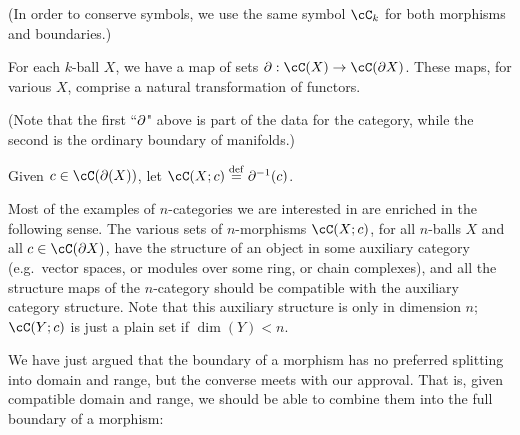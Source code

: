 (In order to conserve symbols, we use the same symbol $\cC_k$ for both morphisms and boundaries.)

\begin{axiom}
For each $k$-ball $X$, we have a map of sets $\bd: \cC(X)\to \cC(\bd X)$.
These maps, for various $X$, comprise a natural transformation of functors.
\end{axiom}

(Note that the first ``$\partial$" above is part of the data for the category, 
while the second is the ordinary boundary of manifolds.)

Given $c\in\cC(\bd(X))$, let $\cC(X; c) \deq \bd^{-1}(c)$.

Most of the examples of $n$-categories we are interested in are enriched in the following sense.
The various sets of $n$-morphisms $\cC(X; c)$, for all $n$-balls $X$ and
all $c\in \cC(\bd X)$, have the structure of an object in some auxiliary category
(e.g.\ vector spaces, or modules over some ring, or chain complexes),
and all the structure maps of the $n$-category should be compatible with the auxiliary
category structure.
Note that this auxiliary structure is only in dimension $n$;
$\cC(Y; c)$ is just a plain set if $\dim(Y) < n$.

\medskip
{}
\medskip

We have just argued that the boundary of a morphism has no preferred splitting into
domain and range, but the converse meets with our approval.
That is, given compatible domain and range, we should be able to combine them into
the full boundary of a morphism:

